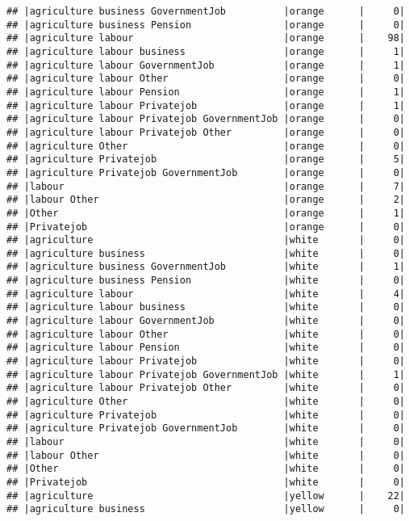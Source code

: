 \documentclass[
]{article}
\begin{document}
\begin{verbatim}
## |agriculture business GovernmentJob          |orange      |     0|
## |agriculture business Pension                |orange      |     0|
## |agriculture labour                          |orange      |    98|
## |agriculture labour business                 |orange      |     1|
## |agriculture labour GovernmentJob            |orange      |     1|
## |agriculture labour Other                    |orange      |     0|
## |agriculture labour Pension                  |orange      |     1|
## |agriculture labour Privatejob               |orange      |     1|
## |agriculture labour Privatejob GovernmentJob |orange      |     0|
## |agriculture labour Privatejob Other         |orange      |     0|
## |agriculture Other                           |orange      |     0|
## |agriculture Privatejob                      |orange      |     5|
## |agriculture Privatejob GovernmentJob        |orange      |     0|
## |labour                                      |orange      |     7|
## |labour Other                                |orange      |     2|
## |Other                                       |orange      |     1|
## |Privatejob                                  |orange      |     0|
## |agriculture                                 |white       |     0|
## |agriculture business                        |white       |     0|
## |agriculture business GovernmentJob          |white       |     1|
## |agriculture business Pension                |white       |     0|
## |agriculture labour                          |white       |     4|
## |agriculture labour business                 |white       |     0|
## |agriculture labour GovernmentJob            |white       |     0|
## |agriculture labour Other                    |white       |     0|
## |agriculture labour Pension                  |white       |     0|
## |agriculture labour Privatejob               |white       |     0|
## |agriculture labour Privatejob GovernmentJob |white       |     1|
## |agriculture labour Privatejob Other         |white       |     0|
## |agriculture Other                           |white       |     0|
## |agriculture Privatejob                      |white       |     0|
## |agriculture Privatejob GovernmentJob        |white       |     0|
## |labour                                      |white       |     0|
## |labour Other                                |white       |     0|
## |Other                                       |white       |     0|
## |Privatejob                                  |white       |     0|
## |agriculture                                 |yellow      |    22|
## |agriculture business                        |yellow      |     0|

\end{verbatim}
\end{document}
